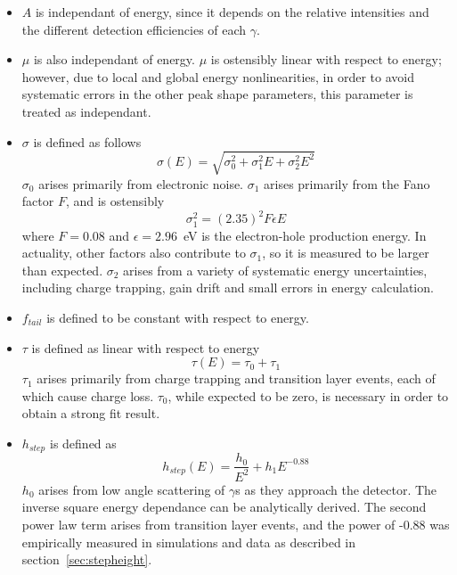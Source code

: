 \documentclass[/main.tex]{subfiles}
\begin{document}
\begin{itemize}
\item $A$ is independant of energy, since it depends on the relative intensities and the different detection efficiencies of each $\gamma$.
\item $\mu$ is also independant of energy.
  $\mu$ is ostensibly linear with respect to energy; however, due to local and global energy nonlinearities, in order to avoid systematic errors in the other peak shape parameters, this parameter is treated as independant.
\item $\sigma$ is defined as follows
  \begin{equation}
    \sigma(E) = \sqrt{\sigma_0^2 + \sigma_1^2E + \sigma_2^2E^2}
  \end{equation}
  $\sigma_0$ arises primarily from electronic noise. $\sigma_1$ arises primarily from the Fano factor $F$, and is ostensibly
  \begin{equation}
    \sigma_1^2 = (2.35)^2F\epsilon E
  \end{equation}
  where $F=0.08$ and $\epsilon=2.96$~eV is the electron-hole production energy.
  In actuality, other factors also contribute to $\sigma_1$, so it is measured to be larger than expected.
  $\sigma_2$ arises from a variety of systematic energy uncertainties, including charge trapping, gain drift and small errors in energy calculation.
\item $f_{tail}$ is defined to be constant with respect to energy.
\item $\tau$ is defined as linear with respect to energy
  \begin{equation}
    \tau(E) = \tau_0 + \tau_1
  \end{equation}
  $\tau_1$ arises primarily from charge trapping and transition layer events, each of which cause charge loss.
  $\tau_0$, while expected to be zero, is necessary in order to obtain a strong fit result.
\item $h_{step}$ is defined as
  \begin{equation}
    h_{step}(E) = \frac{h_0}{E^2} + h_1E^{-0.88}
  \end{equation}
  $h_0$ arises from low angle scattering of $\gamma$s as they approach the detector.
  The inverse square energy dependance can be analytically derived\cite{2016Oberer}.
  The second power law term arises from transition layer events, and the power of -0.88 was empirically measured in simulations and data as described in section~\ref{sec:stepheight}.
\end{itemize}
\end{document}
